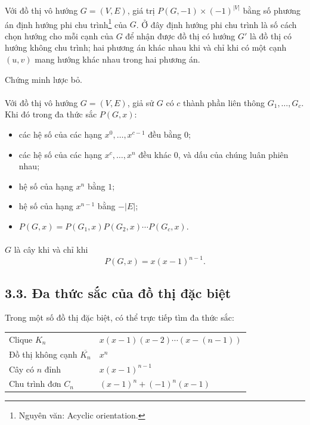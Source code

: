 \documentclass[11pt]{article}
\begin{document}
\paragraph{}
Với đồ thị vô hướng \(G=(V,E)\), giá trị \(P(G,-1)\times(-1)^{|V|}\) bằng số
phương án định hướng phi chu trình\footnote{Nguyên văn: Acyclic orientation.}
của \(G\). Ở đây định hướng phi chu trình là số cách chọn hướng cho mỗi cạnh
của \(G\) để nhận được đồ thị có hướng \(G'\) là đồ thị có hướng không chu
trình; hai phương án khác nhau khi và chỉ khi có một cạnh \((u,v)\) mang
hướng khác nhau trong hai phương án.

Chứng minh lược bỏ.

\paragraph{}
Với đồ thị vô hướng \(G=(V,E)\), giả sử \(G\) có \(c\) thành phần liên thông
\(G_1,\ldots,G_c\). Khi đó trong đa thức sắc \(P(G,x)\):
\begin{itemize}
  \item các hệ số của các hạng \(x^0,\ldots,x^{c-1}\) đều bằng \(0\);
  \item các hệ số của các hạng \(x^c,\ldots,x^n\) đều khác \(0\), và dấu của
        chúng luân phiên nhau;
  \item hệ số của hạng \(x^n\) bằng \(1\);
  \item hệ số của hạng \(x^{n-1}\) bằng \(-|E|\);
  \item \(P(G,x)=P(G_1,x)P(G_2,x)\cdots P(G_c,x)\).
\end{itemize}

\paragraph{}
\(G\) là cây khi và chỉ khi
\[
  P(G,x)=x(x-1)^{n-1}.
\]

\subsection*{3.3. Đa thức sắc của đồ thị đặc biệt}

Trong một số đồ thị đặc biệt, có thể trực tiếp tìm đa thức sắc:

\begin{center}
\begin{tabular}{ll}
Clique \(K_n\) & \(x(x-1)(x-2)\cdots(x-(n-1))\) \\
Đồ thị không cạnh \(\overline{K_n}\) & \(x^n\) \\
Cây có \(n\) đỉnh & \(x(x-1)^{n-1}\) \\
Chu trình đơn \(C_n\) & \((x-1)^n+(-1)^n(x-1)\)
\end{tabular}
\end{center}
\end{document}
